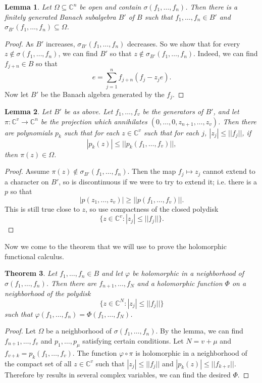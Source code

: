 \documentclass[12pt]{report}
\newcommand{\CC}{\mathbb{C}}
\newtheorem{theorem}{Theorem}[chapter]
\newtheorem{lemma}[theorem]{Lemma}
\theoremstyle{definition}
\begin{document}
\begin{lemma}
    Let $\Omega \subseteq \CC^n$ be open and contain $\sigma(f_1, \dots, f_n)$. Then there is a finitely generated Banach subalgebra $B'$ of $B$ such that $f_1, \dots, f_n \in B'$ and $\sigma_{B'}(f_1, \dots, f_n) \subseteq \Omega$.
\end{lemma}
\begin{proof}
    As $B'$ increases, $\sigma_{B'}(f_1, \dots, f_n)$ decreases. So we show that for every $z \notin \sigma(f_1, \dots, f_n)$, we can find $B'$ so that $z \notin \sigma_{B'}(f_1, \dots, f_n)$. Indeed, we can find $f_{j+n} \in B$ so that
    $$e = \sum_{j=1}^n f_{j+n}(f_j - z_je).$$
    Now let $B'$ be the Banach algebra generated by the $f_j$.
\end{proof}
\begin{lemma}
    Let $B'$ be as above. Let $f_1, \dots, f_v$ be the generators of $B'$, and let $\pi: \CC^v \to \CC^n$ be the projection which annihilates $(0, \dots, 0, z_{n+1}, \dots, z_v)$. Then there are polynomials $p_k$ such that for each $z \in \CC^v$ such that for each $j$, $|z_j| \leq ||f_j||$, if
    $$|p_k(z)| \leq ||p_k(f_1, \dots, f_v)||,$$
    then $\pi(z) \in \Omega$.
\end{lemma}
\begin{proof}
    Assume $\pi(z) \notin \sigma_{B'}(f_1, \dots, f_n)$. Then the map $f_j \mapsto z_j$ cannot extend to a character on $B'$, so is discontinuous if we were to try to extend it; i.e. there is a $p$ so that
    $$|p(z_1, \dots, z_v)| \geq ||p(f_1, \dots, f_v)||.$$
    This is still true close to $z$, so use compactness of the closed polydisk
    $$\{z \in \CC^v: |z_j| \leq ||f_j||\}.$$
\end{proof}
    Now we come to the theorem that we will use to prove the holomorphic functional calculus.
\begin{theorem}
    Let $f_1, \dots, f_n \in B$ and let $\varphi$ be holomorphic in a neighborhood of $\sigma(f_1, \dots, f_n)$. Then there are $f_{n+1}, \dots, f_N$ and a holomorphic function $\Phi$ on a neighborhood of the polydisk
    $$\{z \in \CC^N: |z_j| \leq ||f_j||\}$$
    such that $\varphi(f_1, \dots, f_n) = \Phi(f_1, \dots, f_N)$.
\end{theorem}
\begin{proof}
    Let $\Omega$ be a neighborhood of $\sigma(f_1, \dots, f_n)$. By the lemma, we can find $f_{n+1}, \dots, f_v$ and $p_1, \dots, p_\mu$ satisfying certain conditions. Let $N = v + \mu$ and $f_{v+k} = p_k(f_1, \dots, f_v)$. The function $\varphi \circ \pi$ is holomorphic in a neighborhood of the compact set of all $z \in \CC^v$ such that $|z_j| \leq ||f_j||$ and $|p_k(z)| \leq ||f_{k+v}||$. Therefore by results in several complex variables, we can find the desired $\Phi$.
\end{proof}
\end{document}

